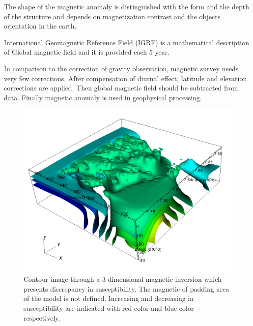 The shape of the magnetic anomaly is distinguished with the form and the depth of the structure and depends on magnetization contrast and the objects orientation in the earth.

International Geomagnetic Reference Field (IGRF) is a mathematical description of Global magnetic field and it  is provided each 5 year.

In comparison to the correction of gravity observation, magnetic survey needs very few corrections. After compensation of diurnal effect, latitude and elevation corrections are applied. Then global magnetic field should be subtracted from data. Finally magnetic anomaly is used in geophysical processing.

\begin{figure}
\centering
\includegraphics[width=\textwidth]{sus3Dc.png}
\caption{Contour image through a 3 dimensional magnetic inversion which presents discrepancy in susceptibility. The magnetic of padding area of the model is not defined. Increasing and decreasing in susceptibility are indicated with red color and blue color respectively.}
\end{figure}


